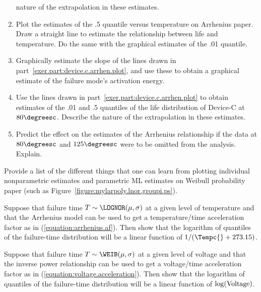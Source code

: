 \begin{exercise}
\begin{enumerate}
nature of the extrapolation in these estimates.
\item
\label{exer.part:device.c.arrhen.plot}
Plot the estimates of the .5 quantile versus temperature on Arrhenius
paper. Draw a straight line to estimate the relationship between life
and temperature. Do the same with the graphical estimates of the .01
quantile.
\item
Graphically estimate the slope of the lines drawn in
part~\ref{exer.part:device.c.arrhen.plot}, and use these to obtain a
graphical estimate of the failure mode's activation energy.
\item
Use the lines drawn in part~\ref{exer.part:device.c.arrhen.plot} to
obtain estimates of the .01 and .5 quantiles of the life distribution
of Device-C at $80\degreesc$. Describe the nature of the extrapolation
in these estimates.
\item
Predict the effect on the estimates of the Arrhenius relationship
if the data at $80\degreesc$ and $125\degreesc$ were to be omitted
from the analysis. Explain.
\end{enumerate}
\end{exercise}

\begin{exercise}
Provide a list of the different things that one can learn from
plotting individual nonparametric estimates and parametric ML
estimates on Weibull probability paper (such as
Figure~\ref{figure:mylarpoly.lnor.groupi.ps}).
\end{exercise}

\begin{exercise}
Suppose that failure time $T \sim \LOGNOR(\mu,\sigma)$ at a given
level of temperature and that the Arrhenius model can be used to get a
temperature/time acceleration factor as in
(\ref{equation:arrhenius.af}). Then show that the logarithm of quantiles
of the failure-time distribution will be a linear function of
$1/(\Tempc{} +273.15)$.
\end{exercise}

\begin{exercise}
Suppose that failure time $T \sim \WEIB(\mu,\sigma)$ at a given
level of voltage and that the inverse power relationship can be used
to get a voltage/time acceleration factor as in
(\ref{equation:voltage.acceleration}). Then show that the logarithm of quantiles
of the failure-time distribution will be a linear function of
$\log({\rm Voltage})$.
\end{exercise}




